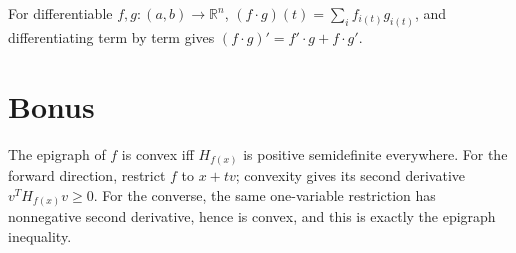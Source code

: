 For differentiable \(f,g:\left( {a,b} \right)\rightarrow\mathbb{R}^{n}\), \(\left( {f \cdot g} \right)(t) = \sum_{i}f_{i{(t)}}g_{i{(t)}}\), and differentiating term by term gives \(\left( {f \cdot g} \right)' = f' \cdot g + f \cdot g'\).

\section{Bonus}

The epigraph of \(f\) is convex iff \(H_{f{(x)}}\) is positive semidefinite everywhere. For the forward direction, restrict \(f\) to \(x + tv\); convexity gives its second derivative \(v^{T}H_{f{(x)}}v \geq 0\). For the converse, the same one-variable restriction has nonnegative second derivative, hence is convex, and this is exactly the epigraph inequality.
